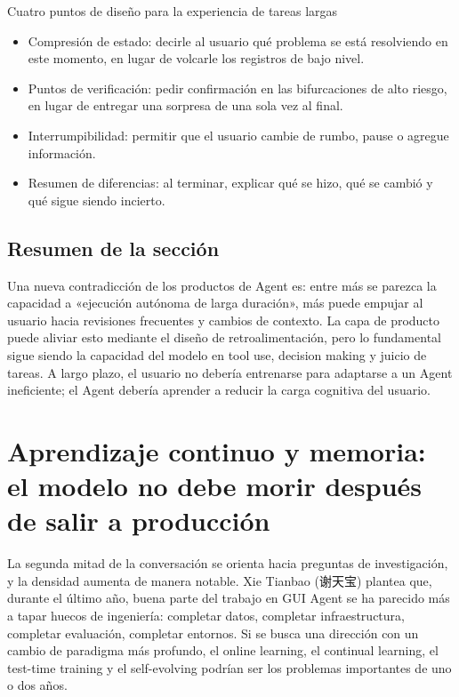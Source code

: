 \documentclass[a4paper]{article}
\begin{document}
\begin{knowledgebox}{Cuatro puntos de diseño para la experiencia de tareas largas}
\begin{itemize}
  \item Compresión de estado: decirle al usuario qué problema se está resolviendo en este momento, en lugar de volcarle los registros de bajo nivel.
  \item Puntos de verificación: pedir confirmación en las bifurcaciones de alto riesgo, en lugar de entregar una sorpresa de una sola vez al final.
  \item Interrumpibilidad: permitir que el usuario cambie de rumbo, pause o agregue información.
  \item Resumen de diferencias: al terminar, explicar qué se hizo, qué se cambió y qué sigue siendo incierto.
\end{itemize}
\end{knowledgebox}

\subsection{Resumen de la sección}

Una nueva contradicción de los productos de Agent es: entre más se parezca la capacidad a «ejecución autónoma de larga duración», más puede empujar al usuario hacia revisiones frecuentes y cambios de contexto. La capa de producto puede aliviar esto mediante el diseño de retroalimentación, pero lo fundamental sigue siendo la capacidad del modelo en tool use, decision making y juicio de tareas. A largo plazo, el usuario no debería entrenarse para adaptarse a un Agent ineficiente; el Agent debería aprender a reducir la carga cognitiva del usuario.

\section{Aprendizaje continuo y memoria: el modelo no debe morir después de salir a producción}

La segunda mitad de la conversación se orienta hacia preguntas de investigación, y la densidad aumenta de manera notable. Xie Tianbao (谢天宝) plantea que, durante el último año, buena parte del trabajo en GUI Agent se ha parecido más a tapar huecos de ingeniería: completar datos, completar infraestructura, completar evaluación, completar entornos. Si se busca una dirección con un cambio de paradigma más profundo, el online learning, el continual learning, el test-time training y el self-evolving podrían ser los problemas importantes de uno o dos años.
\end{document}
